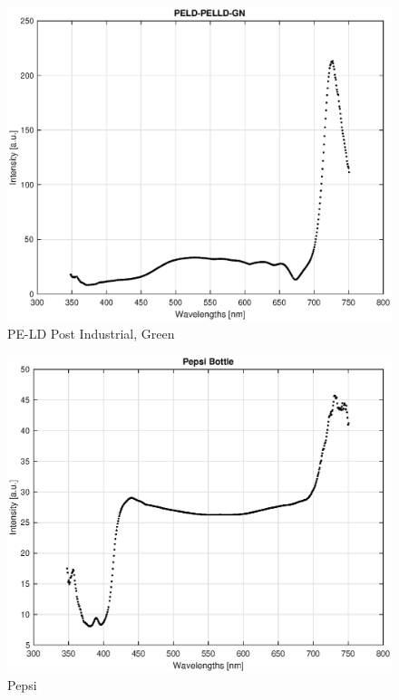 \begin{appendices}
\begin{figure}
    \centering
    \includegraphics[width = 12cm]{Images/appendix/pe-ld-postindust-green.eps}
    \caption[$\; \:$PE-LD Post Industrial, Green]{PE-LD Post Industrial, Green}
    \label{fig:peld-green}
\end{figure}

\begin{figure}
    \centering
    \includegraphics[width = 12cm]{Images/appendix/pepsi.eps}
    \caption[$\; \:$Pepsi]{Pepsi}
    \label{fig:pepsi}
\end{figure}


\end{appendices}
